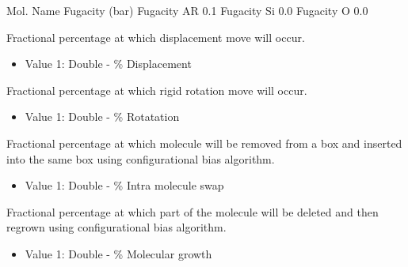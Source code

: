 \documentclass[letterpaper,10pt,english]{sphinxmanual}
\begin{document}
\begin{description}
%
\begin{sphinxVerbatim}[commandchars=\\\{\}]
\PYGZsh{}\PYGZsh{}\PYGZsh{}\PYGZsh{}\PYGZsh{}\PYGZsh{}\PYGZsh{}\PYGZsh{}\PYGZsh{}\PYGZsh{}\PYGZsh{}\PYGZsh{}\PYGZsh{}\PYGZsh{}\PYGZsh{}\PYGZsh{}\PYGZsh{}\PYGZsh{}\PYGZsh{}\PYGZsh{}\PYGZsh{}\PYGZsh{}\PYGZsh{}\PYGZsh{}\PYGZsh{}\PYGZsh{}\PYGZsh{}\PYGZsh{}\PYGZsh{}\PYGZsh{}\PYGZsh{}\PYGZsh{}\PYGZsh{}
\PYGZsh{} Mol.  Name Fugacity (bar)
\PYGZsh{}\PYGZsh{}\PYGZsh{}\PYGZsh{}\PYGZsh{}\PYGZsh{}\PYGZsh{}\PYGZsh{}\PYGZsh{}\PYGZsh{}\PYGZsh{}\PYGZsh{}\PYGZsh{}\PYGZsh{}\PYGZsh{}\PYGZsh{}\PYGZsh{}\PYGZsh{}\PYGZsh{}\PYGZsh{}\PYGZsh{}\PYGZsh{}\PYGZsh{}\PYGZsh{}\PYGZsh{}\PYGZsh{}\PYGZsh{}\PYGZsh{}\PYGZsh{}\PYGZsh{}\PYGZsh{}\PYGZsh{}\PYGZsh{}
Fugacity AR 0.1
Fugacity Si 0.0
Fugacity O 0.0
\end{sphinxVerbatim}

\item[{\sphinxcode{\sphinxupquote{DisFreq}}}] \leavevmode
Fractional percentage at which displacement move will occur.
\begin{itemize}
\item {} 
Value 1: Double - \% Displacement

\end{itemize}

\item[{\sphinxcode{\sphinxupquote{RotFreq}}}] \leavevmode
Fractional percentage at which rigid rotation move will occur.
\begin{itemize}
\item {} 
Value 1: Double - \% Rotatation

\end{itemize}

\item[{\sphinxcode{\sphinxupquote{IntraSwapFreq}}}] \leavevmode
Fractional percentage at which molecule will be removed from a box and inserted into the same box using configurational bias algorithm.
\begin{itemize}
\item {} 
Value 1: Double - \% Intra molecule swap

\end{itemize}

\item[{\sphinxcode{\sphinxupquote{RegrowthFreq}}}] \leavevmode
Fractional percentage at which part of the molecule will be deleted and then regrown using configurational bias algorithm.
\begin{itemize}
\item {} 
Value 1: Double - \% Molecular growth


\end{itemize}
\end{description}
\end{document}
